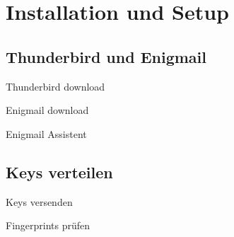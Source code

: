 \section{Installation und Setup}


\subsection{Thunderbird und Enigmail}
\begin{frame}{Thunderbird download}
\end{frame}

\begin{frame}{Enigmail download}
\end{frame}

\begin{frame}{Enigmail Assistent}
\end{frame}

\subsection{Keys verteilen}
\begin{frame}{Keys versenden}
\end{frame}

\begin{frame}{Fingerprints prüfen}
\end{frame}

